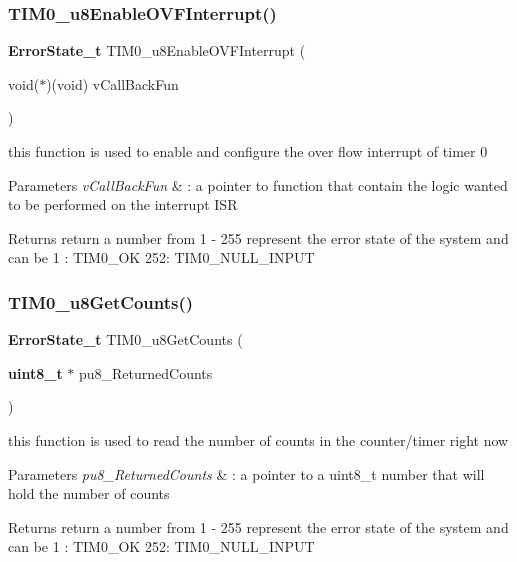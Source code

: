 \subsubsection{T\+I\+M0\+\_\+u8\+Enable\+O\+V\+F\+Interrupt()}
{\footnotesize\ttfamily \textbf{ Error\+State\+\_\+t} T\+I\+M0\+\_\+u8\+Enable\+O\+V\+F\+Interrupt (\begin{DoxyParamCaption}\item[{void($\ast$)(void)}]{v\+Call\+Back\+Fun }\end{DoxyParamCaption})}



this function is used to enable and configure the over flow interrupt of timer 0 


\begin{DoxyParams}{Parameters}
{\em v\+Call\+Back\+Fun} & \+: a pointer to function that contain the logic wanted to be performed on the interrupt I\+SR \\
\hline
\end{DoxyParams}
\begin{DoxyReturn}{Returns}
return a number from 1 -\/ 255 represent the error state of the system and can be 1 \+: T\+I\+M0\+\_\+\+OK 252\+: T\+I\+M0\+\_\+\+N\+U\+L\+L\+\_\+\+I\+N\+P\+UT 
\end{DoxyReturn}
\mbox{\label{_t_i_m_e_r0_8c_affaf298d5dadbb9ea2c5b0782b49b30c}} 
\subsubsection{T\+I\+M0\+\_\+u8\+Get\+Counts()}
{\footnotesize\ttfamily \textbf{ Error\+State\+\_\+t} T\+I\+M0\+\_\+u8\+Get\+Counts (\begin{DoxyParamCaption}\item[{\textbf{ uint8\+\_\+t} $\ast$}]{pu8\+\_\+\+Returned\+Counts }\end{DoxyParamCaption})}



this function is used to read the number of counts in the counter/timer right now 


\begin{DoxyParams}{Parameters}
{\em pu8\+\_\+\+Returned\+Counts} & \+: a pointer to a uint8\+\_\+t number that will hold the number of counts \\
\hline
\end{DoxyParams}
\begin{DoxyReturn}{Returns}
return a number from 1 -\/ 255 represent the error state of the system and can be 1 \+: T\+I\+M0\+\_\+\+OK 252\+: T\+I\+M0\+\_\+\+N\+U\+L\+L\+\_\+\+I\+N\+P\+UT 
\end{DoxyReturn}
\mbox{\label{_t_i_m_e_r0_8c_a7411543d6d0d589f6b5fa318bcf59d88}} 
